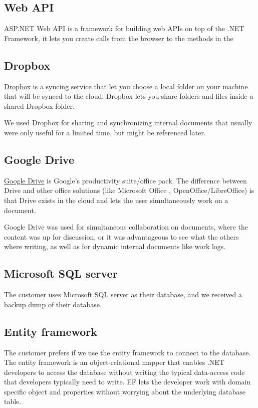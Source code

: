 \subsection{Web API}
ASP.NET Web API is a framework for building web APIs on top of the .NET Framework, it lets you create calls from the browser to the methods in the 

\subsection{Dropbox}
\href{http://www.dropbox.com}{Dropbox} is a syncing service that let you choose a local folder on your machine that will be synced to the cloud. Dropbox lets you share folders and files inside a shared Dropbox folder.

We used Dropbox for sharing and synchronizing internal documents that usually were only useful for a limited time, but might be referenced later.

\subsection{Google Drive}
\href{https://drive.google.com/}{Google Drive} is Google's productivity suite/office pack. The difference between Drive and other office solutions (like Microsoft Office , OpenOffice/LibreOffice) is that Drive exists in the cloud and lets the user simultaneously work on a document.

Google Drive was used for simultaneous collaboration on documents, where the content was up for discussion, or it was advantageous to see what the others where writing, as well as for dynamic internal documents like work logs.

\subsection{Microsoft SQL server}
The customer uses Microsoft SQL server as their database, and we received a backup dump of their database. %

\subsection{Entity framework}
The customer prefers if we use the entity framework to connect to the database. The entity framework is an object-relational mapper that enables .NET developers to access the database without writing the typical data-access code that developers typically need to write. EF lets the developer work with domain specific object and properties without worrying about the underlying database table.
